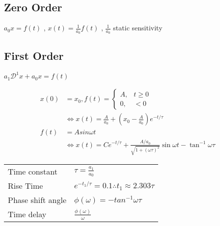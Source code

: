 \documentclass[main.tex]{subfile}
\begin{document}
\tiny


\subsection{Zero Order}
$ a_0x = f(t) $ , $x(t) = \frac{1}{a_0} f(t)$ , $\frac{1}{a_0}$ static sensitivity

\subsection{First Order}
\label{sec:second_order}

$a_1\mathcal{D}^1x + a_0x = f(t)$

\begin{align}
	x(0) &= x_0
	, f(t) = 
	\begin{cases}
		A, & t \geq 0
		\\0, & < 0
	\end{cases}
	\\ & \iff x(t) = \frac{A}{a_0} + (x_0 - \frac{A}{a_0})e^{-t/\tau}
	\\f(t) &= Asin{\omega t}
	\\ & \iff x(t) = Ce^{-t/\tau} + \frac{A/a_0}{\sqrt{1 + (\omega\tau)^2}}
		\sin{\omega t - \tan^{-1}{\omega\tau}}
\end{align}

\begin{table}[H]
  \begin{center}
    \begin{tabular}{ll}
      \\ \toprule
			Time constant & $\tau = \frac{a_1}{a_0}$ 
			\\Rise Time & $e^{-t_1/\tau} = 0.1 \therefore t_1 \approx 2.303\tau$ 
			\\Phase shift angle & $\phi(\omega) = -tan^{-1}{\omega\tau}$
			\\Time delay & $\frac{\phi(\omega)}{\omega}$
      \\ \bottomrule
    \end{tabular}
  \end{center}
\end{table}
\end{document}

